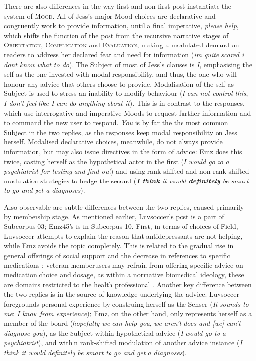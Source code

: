 \documentclass{article}
\renewcommand{\cite}{\parencite}
\begin{document}
{There are also differences in the way first and non-first post instantiate the system of \textsc{Mood}. All of Jess's major Mood choices are declarative and congruently work to provide information, until a final imperative, \emph{please help}, which shifts the function of the post from the recursive narrative stages of \textsc{Orientation}, \textsc{Complication} and \textsc{Evaluation}, making a modulated demand on readers to address her declared fear and need for information (\emph{im quite scared i dont know what to do}). The Subject of most of Jess's clauses is \emph{I}, emphasising the self as the one invested with modal responsibility, and thus, the one who will honour any advice that others choose to provide. Modalisation of the self as Subject is used to stress an inability to modify behaviour (\emph{I can not control this}, \emph{I don't feel like I can do anything about it}). This is in contrast to the responses, which use interrogative and imperative Moods to request further information and to command the new user to respond. \emph{You} is by far the the most common Subject in the two replies, as the responses keep modal responsibility on Jess herself. Modalised declarative choices, meanwhile, do not always provide information, but may also issue directives in the form of advice: Emz does this twice, casting herself as the hypothetical actor in the first (\emph{I would go to a psychiatrist for testing and find out}) and using rank-shifted and non-rank-shifted modulation strategies to hedge the second (\emph{\textbf{I think} it would \textbf{definitely} be smart to go and get a diagnoses}).

Also observable are subtle differences between the two replies, caused primarily by membership stage. As mentioned earlier, Luvsoccer's post is a part of Subcorpus 03; Emz45's is in Subcorpus 10. First, in terms of choices of Field, Luvsoccer attempts to explain the reason that antidepressants are not helping, while Emz avoids the topic completely. This is related to the gradual rise in general offerings of social support and the decrease in references to specific medications \cite{wang_stay_2012}: veteran member{users} may refrain from offering specific advice on medication choice and dosage, as within a normative biomedical ideology, these are domains restricted to the health professional \cite{vayreda_social_2009}. Another key difference between the two replies is in the source of knowledge underlying the advice. Luvsoccer foregrounds personal experience by construing herself as the Senser (\emph{It sounds to me}; \emph{I know from experience}); Emz, on the other hand, only represents herself as a member of the board (\emph{hopefully we can help you}, \emph{we aren't docs and [we] can't diagnose you}), as the Subject within hypothetical advice (\emph{I would go to a psychiatrist}), and within rank-shifted modulation of another advice instance (\emph{I think it would definitely be smart to go and get a diagnoses}). 

}
\end{document}

